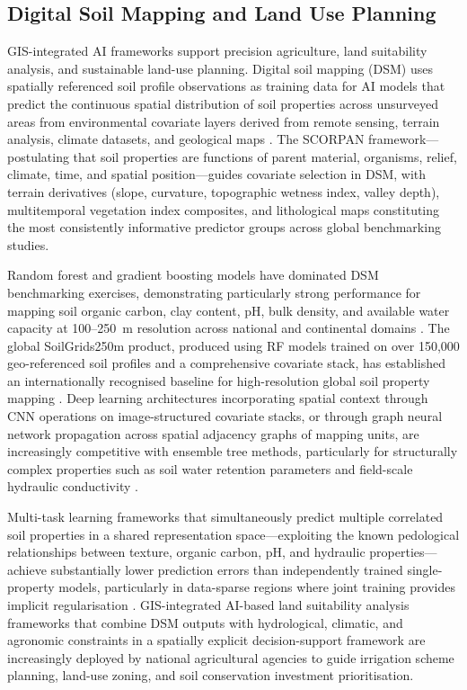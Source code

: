 \documentclass[land,article,submit,pdftex,moreauthors]{Definitions/mdpi}
\numberwithin{equation}{section}
\begin{document}
\subsection{Digital Soil Mapping and Land Use Planning}

GIS-integrated AI frameworks support precision agriculture, land suitability analysis, and sustainable land-use planning. Digital soil mapping (DSM) uses spatially referenced soil profile observations as training data for AI models that predict the continuous spatial distribution of soil properties across unsurveyed areas from environmental covariate layers derived from remote sensing, terrain analysis, climate datasets, and geological maps \citep{mcbratney2003digital}. The SCORPAN framework---postulating that soil properties are functions of parent material, organisms, relief, climate, time, and spatial position---guides covariate selection in DSM, with terrain derivatives (slope, curvature, topographic wetness index, valley depth), multitemporal vegetation index composites, and lithological maps constituting the most consistently informative predictor groups across global benchmarking studies.

Random forest and gradient boosting models have dominated DSM benchmarking exercises, demonstrating particularly strong performance for mapping soil organic carbon, clay content, pH, bulk density, and available water capacity at 100--250~m resolution across national and continental domains \citep{hengl2017soilgrids250m}. The global SoilGrids250m product, produced using RF models trained on over 150,000 geo-referenced soil profiles and a comprehensive covariate stack, has established an internationally recognised baseline for high-resolution global soil property mapping \textcolor{blue}{\citep{hengl2017soilgrids250m, mcbratney2003digital}}. Deep learning architectures incorporating spatial context through CNN operations on image-structured covariate stacks, or through graph neural network propagation across spatial adjacency graphs of mapping units, are increasingly competitive with ensemble tree methods, particularly for structurally complex properties such as soil water retention parameters and field-scale hydraulic conductivity \textcolor{blue}{\citep{padarian2019using, hong2021multimodal}}.

Multi-task learning frameworks that simultaneously predict multiple correlated soil properties in a shared representation space---exploiting the known pedological relationships between texture, organic carbon, pH, and hydraulic properties---achieve substantially lower prediction errors than independently trained single-property models, particularly in data-sparse regions where joint training provides implicit regularisation \textcolor{blue}{\citep{zhang2018deep, Lemenkova202403}}. GIS-integrated AI-based land suitability analysis frameworks that combine DSM outputs with hydrological, climatic, and agronomic constraints in a spatially explicit decision-support framework are increasingly deployed by national agricultural agencies to guide irrigation scheme planning, land-use zoning, and soil conservation investment prioritisation.
\end{document}
